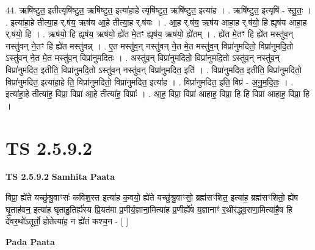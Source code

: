 \documentclass[17pt]{extarticle}
\begin{document}
44. ऋषि॑ष्टुत॒ इतीत्यृषि॑ष्टुत॒ ऋषि॑ष्टुत॒ इत्या॑हा॒हे त्यृषि॑ष्टुत॒ ऋषि॑ष्टुत॒ इत्या॑ह । . ऋषि॑ष्टुत॒ इत्यृषि॑ - स्तु॒तः॒ । . इत्या॑हा॒हे तीत्या॒ह र्.ष॑य॒ ऋष॑य आ॒हे तीत्या॒ह र्.ष॑यः । . आ॒ह र्.ष॑य॒ ऋष॑य आहा॒ह र्.ष॑यो॒ हि ह्यृष॑य आहा॒ह र्.ष॑यो॒ हि । . ऋष॑यो॒ हि ह्यृष॑य॒ ऋष॑यो॒ ह्ये॑त मे॒तꣳ ह्यृष॑य॒ ऋष॑यो॒ ह्ये॑तम् । . ह्ये॑त मे॒तꣳ हि ह्ये॑त मस्तु॑व॒न् नस्तु॑वन् ने॒तꣳ हि ह्ये॑त मस्तु॑वन्न् । . ए॒त मस्तु॑व॒न् नस्तु॑वन् ने॒त मे॒त मस्तु॑व॒न् विप्रा॑नुमदितो॒ विप्रा॑नुमदि॒तो ऽस्तु॑वन् ने॒त मे॒त मस्तु॑व॒न् विप्रा॑नुमदितः । . अस्तु॑व॒न् विप्रा॑नुमदितो॒ विप्रा॑नुमदि॒तो ऽस्तु॑व॒न् नस्तु॑व॒न् विप्रा॑नुमदित॒ इतीति॒ विप्रा॑नुमदि॒तो ऽस्तु॑व॒न् नस्तु॑व॒न् विप्रा॑नुमदित॒ इति॑ । . विप्रा॑नुमदित॒ इतीति॒ विप्रा॑नुमदितो॒ विप्रा॑नुमदित॒ इत्या॑हा॒हे ति॒ विप्रा॑नुमदितो॒ विप्रा॑नुमदित॒ इत्या॑ह । . विप्रा॑नुमदित॒ इति॒ विप्र॑ - अ॒नु॒म॒दि॒तः॒ । . इत्या॑हा॒हे तीत्या॑ह॒ विप्रा॒ विप्रा॑ आ॒हे तीत्या॑ह॒ विप्राः᳚ । . आ॒ह॒ विप्रा॒ विप्रा॑ आहाह॒ विप्रा॒ हि हि विप्रा॑ आहाह॒ विप्रा॒ हि । \newline
\pagebreak
{}

\section{ TS 2.5.9.2 }

\textbf{TS 2.5.9.2 } \newline
\textbf{Samhita Paata} \newline

विप्रा॒ ह्ये॑ते यच्छु॑श्रु॒वाꣳसः॑ कविश॒स्त इत्या॑ह क॒वयो॒ ह्ये॑ते यच्छु॑श्रु॒वाꣳसो॒ ब्रह्म॑सꣳशित॒ इत्या॑ह॒ ब्रह्म॑सꣳशितो॒ ह्ये॑ष घृ॒ताह॑वन॒ इत्या॑ह घृताहु॒तिर्ह्य॑स्य प्रि॒यत॑मा प्र॒णीर्य॒ज्ञाना॒मित्या॑ह प्र॒णीर्ह्ये॑ष य॒ज्ञानाꣳ॑ र॒थीर॑द्ध्व॒राणा॒मित्या॑है॒ष हि दे॑वर॒थो॑ऽतूर्तो॒ होतेत्या॑ह॒ न ह्ये॑तं कश्च॒न - [  ] \newline

\textbf{Pada Paata} \newline
\end{document}
